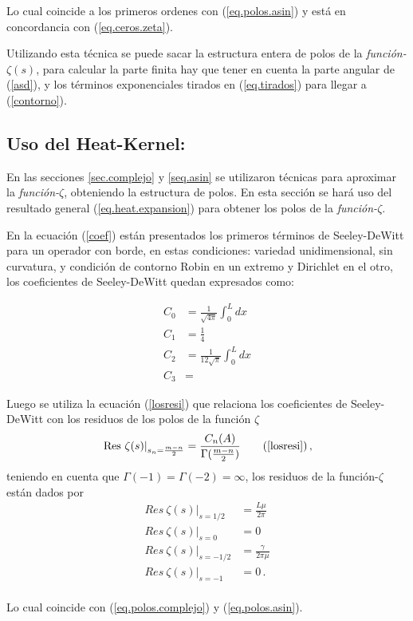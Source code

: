 Lo cual coincide a los primeros ordenes con (\ref{eq.polos.asin}) y está en concordancia  con (\ref{eq.ceros.zeta}).

Utilizando esta técnica se puede sacar la estructura entera de polos de la {\it función-$\zeta (s)$}, para calcular la parte finita hay que tener en cuenta la parte angular de (\ref{asd}), y los términos exponenciales tirados en (\ref{eq.tirados}) para llegar a (\ref{contorno}).


\subsection{Uso del Heat-Kernel:}

En las secciones \ref{sec.complejo} y \ref{seq.asin} se utilizaron técnicas para aproximar la {\it función-$\zeta$}, obteniendo la estructura de polos. En esta sección se hará uso del resultado general (\ref{eq.heat.expansion}) para obtener los polos de la {\it función-$\zeta$}.

En la ecuación (\ref{coef}) están presentados los primeros términos de Seeley-DeWitt para un operador con borde, en estas condiciones: variedad unidimensional, sin curvatura, y condición de contorno Robin en un extremo y Dirichlet en el otro, los coeficientes de Seeley-DeWitt quedan expresados como:


\begin{equation}
\begin{aligned}
C _0 &= \frac{1}{\sqrt{4 \pi}} \int _0 ^L dx\\
C _1 &= \frac{1}{4}  \\
C _2 &= \frac{1}{12 \sqrt{\pi}  } \int _0 ^L dx \\
C _3 &=
\end{aligned}
\end{equation}


Luego se utiliza la ecuación (\ref{losresi}) que relaciona los coeficientes de Seeley-DeWitt con los residuos de los polos de la función $\zeta$
\begin{equation}
\left. {\rm Res} \ \zeta  (s)  \right| _{s_n= \frac{m - n}{2}} =  
\frac{ C_n  (A) }{ {\Gamma ( \frac{m-n}{2}} ) }
\tag{\ref{losresi}}
\, ,
\end{equation}
teniendo en cuenta que $\Gamma (-1) = \Gamma (-2) = \infty$, los residuos de la función-$\zeta$ están dados por
\begin{equation}
\begin{aligned}
Res \  \zeta  (s)  | _{s=1/2} &= \frac{L \mu}{2 \pi} \\[5pt]
Res \  \zeta  (s)  | _{s=0} &= 0 \\[5pt]
Res \ \zeta (s) | _{s=-1/2} &= \frac{\gamma}{2 \pi \mu} \\[5pt]
Res \  \zeta  (s) | _{s=-1} &= 0 \, . \\[5pt]
\end{aligned}
\end{equation}


Lo cual coincide con (\ref{eq.polos.complejo}) y (\ref{eq.polos.asin}).
